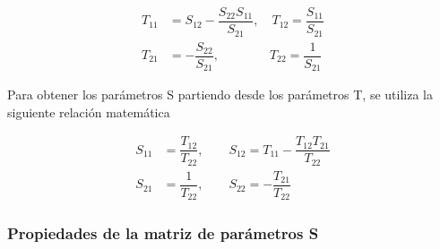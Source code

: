 \begin{equation}
	\begin{aligned}
		T_{11} &= S_{12} - \dfrac{S_{22}S_{11}}{S_{21}},\quad T_{12} = \dfrac{S_{11}}{S_{21}} \\
		T_{21} &= - \dfrac{S_{22}}{S_{21}},\qquad\qquad T_{22} = \dfrac{1}{S_{21}}
	\end{aligned}
	\label{eq:s2t}
\end{equation}

Para obtener los parámetros S partiendo desde los parámetros T, se utiliza la siguiente relación matemática

\begin{equation}
	\begin{aligned}
		S_{11} &= \dfrac{T_{12}}{T_{22}},\qquad S_{12} = T_{11} - \dfrac{T_{12}T_{21}}{T_{22}} \\
		S_{21} &= \dfrac{1}{T_{22}},\qquad S_{22} = - \dfrac{T_{21}}{T_{22}}
	\end{aligned}
	\label{eq:t2s}
\end{equation}


\subsubsection{Propiedades de la matriz de parámetros S}


